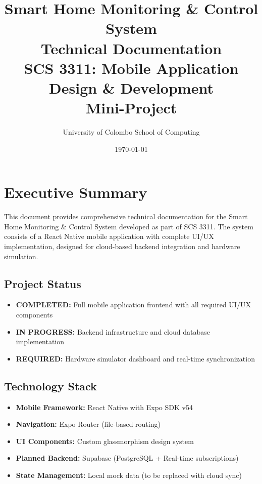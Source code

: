 \documentclass[12pt,a4paper]{article}
\title{\textbf{Smart Home Monitoring \& Control System}\\
\large Technical Documentation\\
\vspace{0.5cm}
\large SCS 3311: Mobile Application Design \& Development\\
Mini-Project}
\author{University of Colombo School of Computing}
\date{\today}
\begin{document}
\maketitle
\newpage

\tableofcontents
\newpage

\section{Executive Summary}

This document provides comprehensive technical documentation for the Smart Home Monitoring \& Control System developed as part of SCS 3311. The system consists of a React Native mobile application with complete UI/UX implementation, designed for cloud-based backend integration and hardware simulation.

\subsection{Project Status}
\begin{itemize}[leftmargin=*]
    \item \textcolor{implemented}{\textbf{COMPLETED:}} Full mobile application frontend with all required UI/UX components
    \item \textcolor{pending}{\textbf{IN PROGRESS:}} Backend infrastructure and cloud database implementation
    \item \textcolor{required}{\textbf{REQUIRED:}} Hardware simulator dashboard and real-time synchronization
\end{itemize}

\subsection{Technology Stack}
\begin{itemize}[leftmargin=*]
    \item \textbf{Mobile Framework:} React Native with Expo SDK v54
    \item \textbf{Navigation:} Expo Router (file-based routing)
    \item \textbf{UI Components:} Custom glassmorphism design system
    \item \textbf{Planned Backend:} Supabase (PostgreSQL + Real-time subscriptions)
    \item \textbf{State Management:} Local mock data (to be replaced with cloud sync)
\end{itemize}
\end{document}
